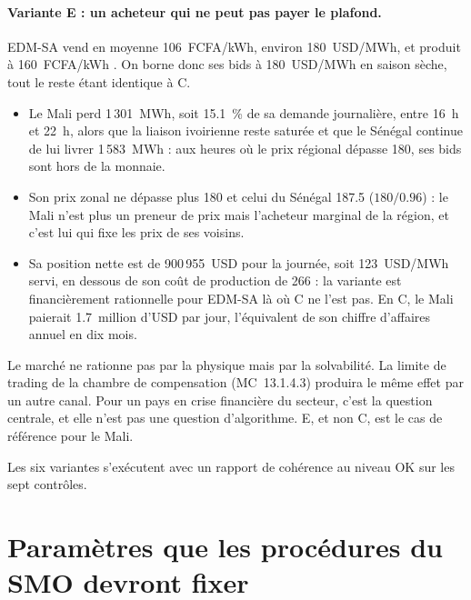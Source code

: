 \documentclass[a4paper,12pt]{article}
\theoremstyle{definition}
\newcommand{\MC}[1]{MC~#1}
\begin{document}
\paragraph{Variante E : un acheteur qui ne peut pas payer le plafond.} EDM-SA vend en moyenne 106~FCFA/kWh, environ 180~USD/MWh, et produit à 160~FCFA/kWh \citep{edm2023}. On borne donc ses bids à 180~USD/MWh en saison sèche, tout le reste étant identique à C.

\begin{itemize}
\item Le Mali perd 1\,301~MWh, soit 15.1~\% de sa demande journalière, entre 16~h et 22~h, alors que la liaison ivoirienne reste saturée et que le Sénégal continue de lui livrer 1\,583~MWh : aux heures où le prix régional dépasse 180, ses bids sont hors de la monnaie.
\item Son prix zonal ne dépasse plus 180 et celui du Sénégal 187.5 ($180/0.96$) : le Mali n'est plus un preneur de prix mais l'acheteur marginal de la région, et c'est lui qui fixe les prix de ses voisins.
\item Sa position nette est de 900\,955~USD pour la journée, soit 123~USD/MWh servi, en dessous de son coût de production de 266 : la variante est financièrement rationnelle pour EDM-SA là où C ne l'est pas. En C, le Mali paierait 1.7~million d'USD par jour, l'équivalent de son chiffre d'affaires annuel en dix mois.
\end{itemize}

Le marché ne rationne pas par la physique mais par la solvabilité. La limite de trading de la chambre de compensation (\MC{13.1.4.3}) produira le même effet par un autre canal. Pour un pays en crise financière du secteur, c'est la question centrale, et elle n'est pas une question d'algorithme. E, et non C, est le cas de référence pour le Mali.

Les six variantes s'exécutent avec un rapport de cohérence au niveau OK sur les sept contrôles.

\section{Paramètres que les procédures du SMO devront fixer}\label{sec:ouverts}
\end{document}
